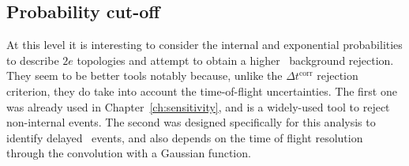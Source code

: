 \subsection{Probability cut-off}

At this level it is interesting to consider the internal and exponential probabilities to describe $2e$ topologies and attempt to obtain a higher \Tl\ background rejection.
They seem to be better tools notably because, unlike the $\Delta t^{\text{corr}}$ rejection criterion, they do take into account the time-of-flight uncertainties.
The first one was already used in Chapter~\ref{ch:sensitivity}, and is a widely-used tool to reject non-internal events.
The second was designed specifically for this analysis to identify delayed \Tl\ events, and also depends on the time of flight resolution through the convolution with a Gaussian function.

